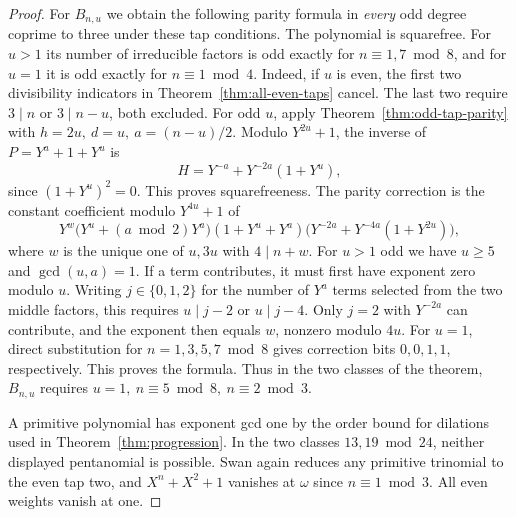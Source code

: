 \documentclass[11pt]{article}
\begin{document}
\begin{proof}
For \(B_{n,u}\) we obtain the following parity formula in
\emph{every} odd degree coprime to three under these tap conditions.
The polynomial is squarefree. For \(u>1\) its number of irreducible
factors is odd exactly for \(n\equiv1,7\bmod8\), and for \(u=1\)
it is odd exactly for \(n\equiv1\bmod4\).
Indeed, if \(u\) is even, the first two divisibility indicators in
Theorem~\ref{thm:all-even-taps} cancel. The last two require
\(3\mid n\) or \(3\mid n-u\), both excluded. For odd \(u\), apply
Theorem~\ref{thm:odd-tap-parity} with \(h=2u,\ d=u,\ a=(n-u)/2\).
Modulo \(Y^{2u}+1\), the inverse of \(P=Y^a+1+Y^u\) is
\[
 H=Y^{-a}+Y^{-2a}(1+Y^u),
\]
since \((1+Y^u)^2=0\). This proves squarefreeness. The parity
correction is the constant coefficient modulo \(Y^{4u}+1\) of
\[
 Y^w\big(Y^u+(a\bmod2)Y^a\big)(1+Y^u+Y^a)
 \big(Y^{-2a}+Y^{-4a}(1+Y^{2u})\big),
\]
where \(w\) is the unique one of \(u,3u\) with \(4\mid n+w\).
For \(u>1\) odd we have \(u\ge5\) and \(\gcd(u,a)=1\).
If a term contributes, it must first have exponent zero modulo \(u\).
Writing \(j\in\{0,1,2\}\) for the number of \(Y^a\) terms selected
from the two middle factors, this requires \(u\mid j-2\) or
\(u\mid j-4\). Only \(j=2\) with \(Y^{-2a}\) can contribute,
and the exponent then equals \(w\), nonzero modulo \(4u\).
For \(u=1\), direct substitution for \(n=1,3,5,7\bmod8\) gives
correction bits \(0,0,1,1\), respectively. This proves the formula.
Thus in the two classes of the theorem, \(B_{n,u}\) requires
\(u=1,\ n\equiv5\bmod8,\ n\equiv2\bmod3\).

A primitive polynomial has exponent gcd one by the order bound for
dilations used in Theorem~\ref{thm:progression}. In the two classes
\(13,19\bmod24\), neither displayed pentanomial is possible. Swan
again reduces any primitive trinomial to the even tap two, and
\(X^n+X^2+1\) vanishes at \(\omega\) since \(n\equiv1\bmod3\).
All even weights vanish at one.
\end{proof}
\end{document}
